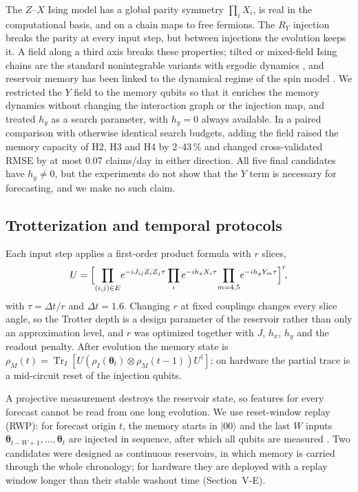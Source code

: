 \documentclass[journal]{IEEEtran}
\newcommand{\Tr}{\operatorname{Tr}}
\begin{document}
The $Z$--$X$ Ising model has a global parity symmetry $\prod_i X_i$, is real in the computational basis, and on a chain maps to free fermions. The $R_Y$ injection breaks the parity at every input step, but between injections the evolution keeps it. A field along a third axis breaks these properties; tilted or mixed-field Ising chains are the standard nonintegrable variants with ergodic dynamics \cite{Banuls2011Thermalization,Kim2013Ballistic}, and reservoir memory has been linked to the dynamical regime of the spin model \cite{MartinezPena2021Phase}. We restricted the $Y$ field to the memory qubits so that it enriches the memory dynamics without changing the interaction graph or the injection map, and treated $h_y$ as a search parameter, with $h_y=0$ always available. In a paired comparison with otherwise identical search budgets, adding the field raised the memory capacity of H2, H3 and H4 by 2--43\,\% and changed cross-validated RMSE by at most 0.07 claims/day in either direction. All five final candidates have $h_y\neq0$, but the experiments do not show that the $Y$ term is necessary for forecasting, and we make no such claim.

\subsection{Trotterization and temporal protocols}
Each input step applies a first-order product formula with $r$ slices,
\begin{equation}
U=\Bigl[\prod_{(i,j)\in E}\!e^{-iJ_{ij}Z_iZ_j\tau}\prod_{i}e^{-ih_xX_i\tau}\!\prod_{m=4,5}\!e^{-ih_yY_m\tau}\Bigr]^r\!,
\label{eq:trotter}
\end{equation}
with $\tau=\Delta t/r$ and $\Delta t=1.6$. Changing $r$ at fixed couplings changes every slice angle, so the Trotter depth is a design parameter of the reservoir rather than only an approximation level, and $r$ was optimized together with $J$, $h_x$, $h_y$ and the readout penalty. After evolution the memory state is $\rho_M(t)=\Tr_I[U(\rho_I(\bm\theta_t)\otimes\rho_M(t-1))U^\dagger]$; on hardware the partial trace is a mid-circuit reset of the injection qubits.

A projective measurement destroys the reservoir state, so features for every forecast cannot be read from one long evolution. We use reset-window replay (RWP): for forecast origin $t$, the memory starts in $|00\rangle$ and the last $W$ inputs $\bm\theta_{t-W+1},\dots,\bm\theta_t$ are injected in sequence, after which all qubits are measured \cite{Mujal2023Measurements}. Two candidates were designed as continuous reservoirs, in which memory is carried through the whole chronology; for hardware they are deployed with a replay window longer than their stable washout time (Section~V-E).
\end{document}
